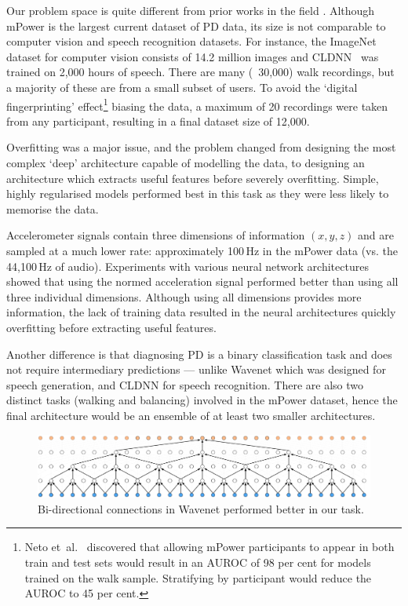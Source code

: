 \documentclass[12pt, twoside]{book}
\begin{document}
Our problem space is quite different from prior works in the field . Although mPower is the largest current dataset of PD data, its size is not comparable to computer vision and speech recognition datasets. For instance, the ImageNet~\cite{imagenet} dataset for computer vision consists of 14.2 million images and CLDNN~\cite{convlstm} was trained on 2,000 hours of speech. There are many (~30,000) walk recordings, but a majority of these are from a small subset of users. To avoid the `digital fingerprinting' effect\footnote{Neto et~al.~\cite{mpowerneto2017analysis} discovered that allowing mPower participants to appear in both train and test sets would result in an AUROC of 98 per cent for models trained on the walk sample. Stratifying by participant would reduce the AUROC to 45 per cent.} biasing the data, a maximum of 20 recordings were taken from any participant, resulting in a final dataset size of 12,000.

Overfitting was a major issue, and the problem changed from designing the most complex `deep' architecture capable of modelling the data, to designing an architecture which extracts useful features before severely overfitting. Simple, highly regularised models performed best in this task as they were less likely to memorise the data.


Accelerometer signals contain three dimensions of information $(x,y,z)$ and are sampled at a much lower rate: approximately 100$\,$Hz in the mPower data (vs. the 44,100$\,$Hz of audio). Experiments with various neural network architectures showed that using the normed acceleration signal performed better than using all three individual dimensions. Although using all dimensions provides more information, the lack of training data resulted in the neural architectures quickly overfitting before extracting useful features. 

Another difference is that diagnosing PD is a binary classification task and does not require intermediary predictions --- unlike Wavenet which was designed for speech generation, and CLDNN for speech recognition. There are also two distinct tasks (walking and balancing) involved in the mPower dataset, hence the final architecture would be an ensemble of at least two smaller architectures.


\begin{figure}[!htb]
	\centering\centerline{\includegraphics[width=1\linewidth]{biwavenet.png}}
	\caption{Bi-directional connections in Wavenet performed better in our task. }
	\label{biwavenet}
	\vspace{-0.5em}
\end{figure}
\end{document}
